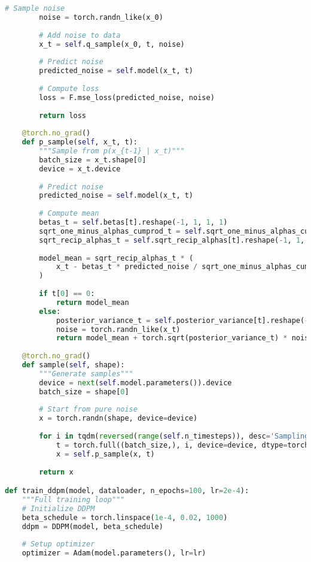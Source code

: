 \documentclass[11pt,a4paper]{article}
\theoremstyle{definition}
\begin{document}
\begin{lstlisting}[language=Python, caption=Complete DDPM Training Implementation]
        # Sample noise
        noise = torch.randn_like(x_0)
        
        # Add noise to data
        x_t = self.q_sample(x_0, t, noise)
        
        # Predict noise
        predicted_noise = self.model(x_t, t)
        
        # Compute loss
        loss = F.mse_loss(predicted_noise, noise)
        
        return loss
    
    @torch.no_grad()
    def p_sample(self, x_t, t):
        """Sample from p(x_{t-1} | x_t)"""
        batch_size = x_t.shape[0]
        device = x_t.device
        
        # Predict noise
        predicted_noise = self.model(x_t, t)
        
        # Compute mean
        betas_t = self.betas[t].reshape(-1, 1, 1, 1)
        sqrt_one_minus_alphas_cumprod_t = self.sqrt_one_minus_alphas_cumprod[t].reshape(-1, 1, 1, 1)
        sqrt_recip_alphas_t = self.sqrt_recip_alphas[t].reshape(-1, 1, 1, 1)
        
        model_mean = sqrt_recip_alphas_t * (
            x_t - betas_t * predicted_noise / sqrt_one_minus_alphas_cumprod_t
        )
        
        if t[0] == 0:
            return model_mean
        else:
            posterior_variance_t = self.posterior_variance[t].reshape(-1, 1, 1, 1)
            noise = torch.randn_like(x_t)
            return model_mean + torch.sqrt(posterior_variance_t) * noise
    
    @torch.no_grad()
    def sample(self, shape):
        """Generate samples"""
        device = next(self.model.parameters()).device
        batch_size = shape[0]
        
        # Start from pure noise
        x = torch.randn(shape, device=device)
        
        for i in tqdm(reversed(range(self.n_timesteps)), desc='Sampling'):
            t = torch.full((batch_size,), i, device=device, dtype=torch.long)
            x = self.p_sample(x, t)
        
        return x

def train_ddpm(model, dataloader, n_epochs=100, lr=2e-4):
    """Full training loop"""
    # Initialize DDPM
    beta_schedule = torch.linspace(1e-4, 0.02, 1000)
    ddpm = DDPM(model, beta_schedule)
    
    # Setup optimizer
    optimizer = Adam(model.parameters(), lr=lr)
    

\end{lstlisting}
\end{document}
